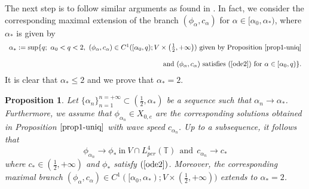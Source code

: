 \documentclass[12pt,reqno]{amsart}
\newcommand{\2}{L^2_{per}(0, T)}
\newtheorem{prop}{Proposition}[section]
\numberwithin{equation}{section}
\numberwithin{figure}{section}
\begin{document}
The next step is to follow similar arguments as found in \cite[Subsection 5.2]{FL}. In fact, we consider the corresponding maximal extension of the branch $(\phi_{\alpha}, c_{\alpha})$ for
$\alpha\in [\alpha_0, \alpha_{*})$, where $\alpha_{*}$ is given by
$$\begin{array}{rrrr}\alpha_{*}:=\sup\{q;\ \alpha_0<q<2,\  (\phi_{\alpha},c_{\alpha})\in C^1([\alpha_0, q);V\times \left(\frac{1}{2},+\infty\right))\ \mbox{given by Proposition \ref{prop1-uniq}}\\\\
\mbox{and}\ (\phi_{\alpha}, c_{\alpha})\ \mbox{satisfies (\ref{ode2}) for}\ \alpha\in [\alpha_0, q)\}.\end{array}$$
It is clear that $\alpha_{*}\leq2$ and we prove that $\alpha_{*}=2$.

\begin{prop}\label{prop-seq-ext}
	Let $\{\alpha_n\}_{n=1}^{n=+\infty}\subset (\frac{1}{2}, \alpha_{*})$ be a sequence such that $\alpha_n\rightarrow \alpha_{*}$. Furthermore,
	we assume that $\phi_{\alpha_n}\in X_{0,e}$ are the corresponding solutions obtained in Proposition $\ref{prop1-uniq}$ with wave speed $c_{\alpha_{n}}$. Up to a subsequence, it follows that
	$$\phi_{\alpha_n}\rightarrow \phi_{*}\ \mbox{in}\ V\cap L_{per}^4(\mathbb{T})\ \ \mbox{and}\ \ c_{\alpha_n}\rightarrow c_{*}$$
	where $c_{*}\in \left(\frac{1}{2},+\infty\right)$ and $\phi_{*}$ satisfy $(\ref{ode2})$. Moreover, the corresponding maximal branch $(\phi_{\alpha}, c_{\alpha})\in C^1([\alpha_0, \alpha_{*});V\times\left(\frac{1}{2},+\infty\right))$ extends to $\alpha_{*}=2$.
\end{prop}
\end{document}
